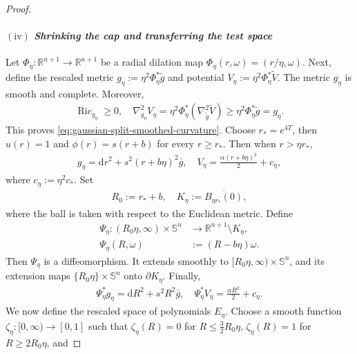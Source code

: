 \documentclass[11pt,reqno]{amsart}
\numberwithin{equation}{section}
\theoremstyle{definition}
\theoremstyle{remark}
\newcommand{\ud}{\mathrm{d}}
\newcommand{\0}{\emptyset}
\newcommand{\bbR}{\mathbb R}
\newcommand{\bbS}{\mathbb S}
\newcommand{\Ric}{\operatorname{Ric}}
\begin{document}
\begin{proof}
\paragraph{$\mathrm{(iv)}$ \textit{Shrinking the cap and transferring the test space}} Let
$\Phi_\eta:\bbR^{n+1}\to\bbR^{n+1}$ be a radial dilation map $\Phi_\eta(r,\omega)=(r/\eta,\omega)$. Next, define the rescaled metric $g_\eta :=\eta^2\Phi_\eta^*\widetilde g$ and potential $V_\eta:=\eta^2\Phi_\eta^*\widetilde V.$
The metric $g_\eta$ is smooth and complete. Moreover,
\begin{align}
        \Ric_{g_\eta}
        \geq
        0,\quad 
        \nabla_{g_\eta}^2V_\eta
        =
        \eta^2\Phi_\eta^*
        (
        \nabla_{\widetilde g}^2\widetilde V
        )
        \geq
        \eta^2\Phi_\eta^*\widetilde g
        =
        g_\eta.
\end{align}
This proves \eqref{eq:gaussian-split-smoothed-curvature}. Choose $r_*=e^{4T}$, then $u(r)=1$ and $\phi(r)=s(r+b)$ for every $r\geq r_*$. Then when  $r>\eta r_*$,
\begin{align}
        g_\eta
        =
        \ud r^2+s^2(r+b\eta)^2\bar g,\quad 
        V_\eta
        =
        \frac{\alpha(r+b\eta)^2}{2}+c_\eta,
\end{align}
where $c_\eta:=\eta^2c_*$. Set
\begin{align}
        R_0
        :=
        r_*+b,
        \quad
        K_\eta
        :=
        \overline{B_{\eta r_*}(0)},
\end{align}
where the ball is taken with respect to the Euclidean metric. Define
\begin{align}
        \Psi_\eta:
        (R_0\eta,\infty)\times\bbS^n
        &\rightarrow
        \bbR^{n+1}\setminus K_\eta,
        \\
        \Psi_\eta(R,\omega)
        &:=
        (R-b\eta)\omega.
\end{align}
Then $\Psi_\eta$ is a diffeomorphism. It extends smoothly to
$[R_0\eta,\infty)\times\bbS^n$, and its extension maps
$\{R_0\eta\}\times\bbS^n$ onto $\partial K_\eta$. Finally,
\begin{align}\label{eq:gaussian-split-geta-end}
        \Psi_\eta^*g_\eta
        =
        \ud R^2+s^2R^2\bar g,\quad 
        \Psi_\eta^*V_\eta
        =
        \frac{\alpha R^2}{2}+c_\eta.
\end{align}
We now define the rescaled space of polynomials $E_\eta$. Choose a smooth function $\zeta_\eta:[0,\infty)\to[0,1]$ such that
$\zeta_\eta(R)=0$ for $R\leq\frac32R_0\eta$,
$\zeta_\eta(R)=1$ for $R\geq2R_0\eta$, and

\end{proof}
\end{document}
